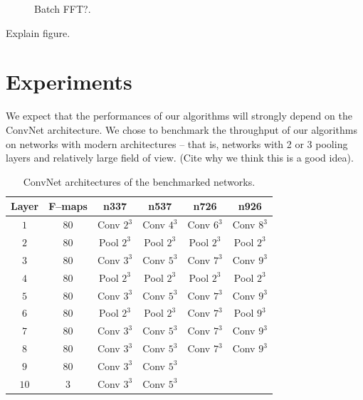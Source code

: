 \documentclass[conference]{IEEEtran}
\begin{document}
  \begin{figure}
    \centering
    \caption{Batch FFT?.}
    \label{fig:fftbatch}
  \end{figure}

  Explain figure.


\section{Experiments}

  We expect that the performances of our algorithms will strongly
  depend on the ConvNet architecture.  We chose to benchmark the
  throughput of our algorithms on networks with modern architectures
  -- that is, networks with 2 or 3 pooling layers and relatively large
  field of view. (Cite why we think this is a good idea).

  \begin{table}
    \centering
    \begin{tabular}{cccccc}
      \toprule
      Layer & F--maps & n337    & n537  &  n726  &  n926 \\
      \midrule
      $1$ & 80 &  Conv $2^3$  & Conv $4^3$  & Conv $6^3$  & Conv $8^3$ \\
      $2$ & 80 &  Pool $2^3$  & Pool $2^3$  & Pool $2^3$  & Pool $2^3$ \\
      $3$ & 80 &  Conv $3^3$  & Conv $5^3$  & Conv $7^3$  & Conv $9^3$ \\
      $4$ & 80 &  Pool $2^3$  & Pool $2^3$  & Pool $2^3$  & Pool $2^3$ \\
      $5$ & 80 &  Conv $3^3$  & Conv $5^3$  & Conv $7^3$  & Conv $9^3$ \\
      $6$ & 80 &  Pool $2^3$  & Pool $2^3$  & Conv $7^3$  & Pool $9^3$ \\
      $7$ & 80 &  Conv $3^3$  & Conv $5^3$  & Conv $7^3$  & Conv $9^3$ \\
      $8$ & 80 &  Conv $3^3$  & Conv $5^3$  & Conv $7^3$  & Conv $9^3$ \\
      $9$ & 80 & Conv $3^3$  & Conv $5^3$  & & \\
      $10$ & 3 & Conv $3^3$  & Conv $5^3$  & & \\
      \bottomrule
    \end{tabular}
    \caption{ConvNet architectures of the benchmarked networks.}
    \label{table:benchmarked_networks}
  \end{table}
\end{document}
